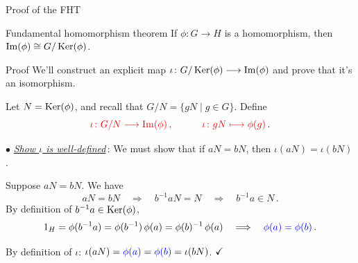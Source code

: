 \documentclass[8pt]{beamer}
\newcommand{\Pause}{}      %
\begin{document}
\begin{frame}{Proof of the FHT}
  
  \begin{block}{Fundamental homomorphism theorem} 
    If $\phi\colon G\to H$ is a homomorphism, then $\operatorname{Im}(\phi)\cong
    G/\operatorname{Ker}(\phi)$.
  \end{block}
  
  \begin{exampleblock}{Proof} \Pause
    We'll construct an explicit map $\iota\colon
    G/\operatorname{Ker}(\phi)\longrightarrow\operatorname{Im}(\phi)$ and prove that it's an
    isomorphism.
    
    \medskip\pause
    
    Let $N=\operatorname{Ker}(\phi)$, and recall that $G/N=\{gN\mid g\in
    G\}$. \Pause Define
    \[
    \Alert{\iota\colon G/N\longrightarrow\Image(\phi)\,,\qquad\quad \iota\colon
      gN\longmapsto\Pause\phi(g)}\,.
    \]
    
    \Pause
    
    \pause $\bullet$ \underline{\emph{Show $\iota$ is well-defined}}\,: \Pause
    We must show that if $aN=bN$, then $\iota(aN)=\iota(bN)$.
    
    \medskip\Pause 
    
    Suppose $aN=bN$. \Pause We have
    \[
    aN=bN \quad\Longrightarrow\quad\Pause b^{-1}aN=N
    \quad\Longrightarrow\quad\Pause b^{-1}a\in N\,.\Pause
    \]
    \pause By definition of $b^{-1}a\in\operatorname{Ker}(\phi)$,%
    \[
    1_H=\phi(b^{-1}a)\Pause=\phi(b^{-1})\,\phi(a)\Pause
    =\phi(b)^{-1}\,\phi(a)\Pause\quad\Longrightarrow\quad
    {\color{blue}\phi(a)=\phi(b)}\,.
    \]
    
    \Pause
    
    By definition of $\iota$:\quad
    $\iota(aN)={\color{blue}\phi(a)}\Pause={\color{blue}\phi(b)}\Pause
    =\iota(bN)$. $\hfill\checkmark$
  \end{exampleblock}

\end{frame}

\end{document}

